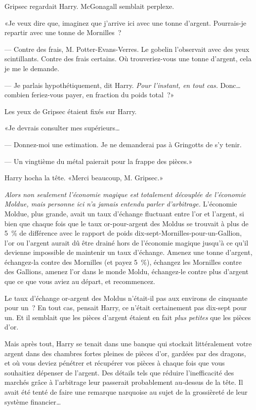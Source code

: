 Gripsec regardait Harry. McGonagall semblait perplexe.

«Je veux dire que, imaginez que j'arrive ici avec une tonne d'argent. Pourrais-je repartir avec une tonne de Mornilles~?

--- Contre des frais, M. Potter-Evans-Verres. Le gobelin l'observait avec des yeux scintillants. Contre des frais certains. Où trouveriez-vous une tonne d'argent, cela je me le demande.

--- Je parlais hypothétiquement, dit Harry. \emph{Pour l'instant, en tout cas.} Donc… combien feriez-vous payer, en fraction du poids total~?»

Les yeux de Gripsec étaient fixés sur Harry.

«Je devrais consulter mes supérieurs…

--- Donnez-moi une estimation. Je ne demanderai pas à Gringotts de s'y tenir.

--- Un vingtième du métal paierait pour la frappe des pièces.»

Harry hocha la tête. «Merci beaucoup, M. Gripsec.»

\emph{Alors non seulement l'économie magique est totalement découplée de l'économie Moldue, mais personne ici n'a jamais entendu parler d'arbitrage.} L'économie Moldue, plus grande, avait un taux d'échange fluctuant entre l'or et l'argent, si bien que chaque fois que le taux or-pour-argent des Moldus se trouvait à plus de 5~\% de différence avec le rapport de poids dix-sept-Mornilles-pour-un-Gallion, l'or ou l'argent aurait dû être drainé hors de l'économie magique jusqu'à ce qu'il devienne impossible de maintenir un taux d'échange. Amenez une tonne d'argent, échangez-la contre des Mornilles (et payez 5~\%), échangez les Mornilles contre des Gallions, amenez l'or dans le monde Moldu, échangez-le contre plus d'argent que ce que vous aviez au départ, et recommencez.

Le taux d'échange or-argent des Moldus n'était-il pas aux environs de cinquante pour un~? En tout cas, pensait Harry, ce n'était certainement pas dix-sept pour un. Et il semblait que les pièces d'argent étaient en fait \emph{plus petites} que les pièces d'or.

Mais après tout, Harry se tenait dans une banque qui stockait littéralement votre argent dans des chambres fortes pleines de pièces d'or, gardées par des dragons, et où vous deviez pénétrer et récupérer vos pièces à chaque fois que vous souhaitiez dépenser de l'argent. Des détails tels que réduire l'inefficacité des marchés grâce à l'arbitrage leur passerait probablement au-dessus de la tête. Il avait été tenté de faire une remarque narquoise au sujet de la grossièreté de leur système financier…

